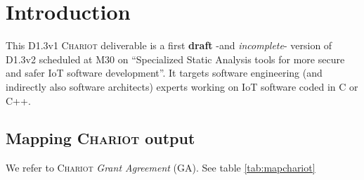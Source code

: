 \section{Introduction}

This D1.3v1 \textsc{Chariot} deliverable is a first \textbf{draft}
-and \emph{incomplete}- version of D1.3v2 scheduled at M30 on
``Specialized Static Analysis tools for more secure and safer IoT
software development''. It targets software engineering (and
indirectly also software architects) experts working on IoT software
coded in C or C++.

\subsection{Mapping \textsc{Chariot} output}
\label{subsec:mapchariot}

We refer to \textsc{Chariot} \emph{Grant Agreement} (GA). See table \ref{tab:mapchariot}


